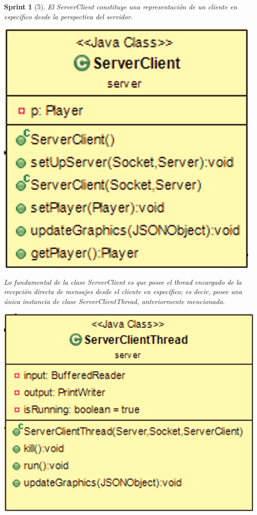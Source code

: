 \documentclass{article}
\theoremstyle{break}
\newtheorem*{sprint}{Sprint}
\begin{document}
\begin{sprint}[5]
El ServerClient constituye una representación de un cliente en específico desde la perspectiva del servidor. 

\begin{center}
\includegraphics[scale=0.3]{ServerClient-sprint5.png} 
\end{center}

Lo fundamental de la clase ServerClient es que posee el thread encargado de la recepción directa de mensajes desde el cliente en específico; es decir, posee una única instancia de clase ServerClientThread, anteriormente mencionada.

\begin{center}
\includegraphics[scale=0.3]{ServerClientThread-sprint5.png} 
\end{center}


\end{sprint}
\end{document}
